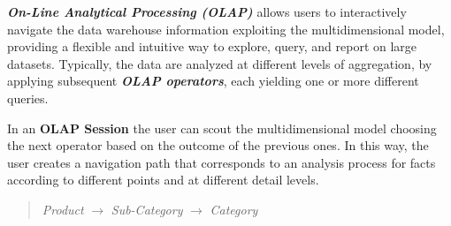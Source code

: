 \textbf{\textit{On-Line Analytical Processing (OLAP)}} allows users  to interactively navigate the data warehouse information exploiting the multidimensional model, providing a flexible and intuitive way to explore, query, and report on large datasets. Typically, the data are analyzed at different levels of aggregation, by applying subsequent \textit{\textbf{OLAP operators}}, each yielding one or more different queries.

In an \textbf{OLAP Session} the user can scout the multidimensional model choosing the next operator based on the outcome of the previous ones. In this way, the user creates a navigation path that corresponds to an analysis process for facts according to different points and at different detail levels.
\begin{quote}
    \centering
    \textit{Product} $\longrightarrow$ \textit{Sub-Category} $\longrightarrow$ \textit{Category}
\end{quote}

